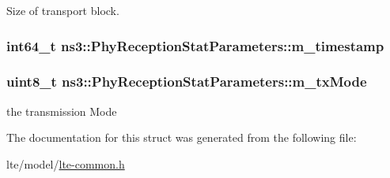 Size of transport block. 

\subsubsection[{\texorpdfstring{m\+\_\+timestamp}{m_timestamp}}]{\setlength{\rightskip}{0pt plus 5cm}int64\+\_\+t ns3\+::\+Phy\+Reception\+Stat\+Parameters\+::m\+\_\+timestamp}\hypertarget{structns3_1_1PhyReceptionStatParameters_aea5173dcf64357e0eb2bfeaf3d8755d0}{}\label{structns3_1_1PhyReceptionStatParameters_aea5173dcf64357e0eb2bfeaf3d8755d0}
\subsubsection[{\texorpdfstring{m\+\_\+tx\+Mode}{m_txMode}}]{\setlength{\rightskip}{0pt plus 5cm}uint8\+\_\+t ns3\+::\+Phy\+Reception\+Stat\+Parameters\+::m\+\_\+tx\+Mode}\hypertarget{structns3_1_1PhyReceptionStatParameters_a0be64ea75aee89d9cd9dc063c87a9c34}{}\label{structns3_1_1PhyReceptionStatParameters_a0be64ea75aee89d9cd9dc063c87a9c34}


the transmission Mode 



The documentation for this struct was generated from the following file\+:\begin{DoxyCompactItemize}
\item 
lte/model/\hyperlink{lte-common_8h}{lte-\/common.\+h}\end{DoxyCompactItemize}
